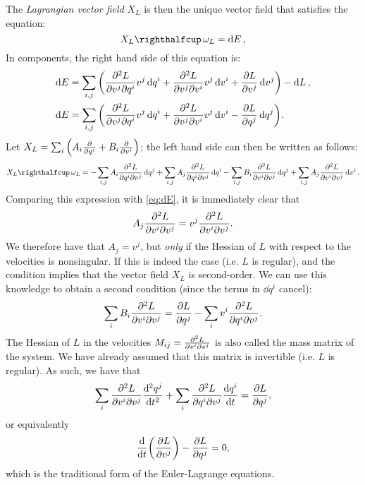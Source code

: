 The \emph{Lagrangian vector field} \(X_L\) is then the unique vector field that satisfies the equation: \cite{Godbillon1969}
\begin{equation}
    \intpr{X_L}{\omega_L} = \dd{E},
    \label{eq:EL_nocomp}
\end{equation}
In components, the right hand side of this equation is:
\begin{equation}
    \begin{split}
        \dd{E} &= \sum_{i, j}\qty(\pdv[2]{L}{v^j}{q^i}v^j\dd{q^i} + \pdv[2]{L}{v^j}{v^i}v^j\dd{v^i} + \pdv{L}{v^j}\dd{v^j}) - \dd{L}, \\
        \dd{E} &= \sum_{i, j}\qty(\pdv[2]{L}{v^j}{q^i}v^j\dd{q^i} + \pdv[2]{L}{v^j}{v^i}v^j\dd{v^i} - \pdv{L}{q^j}\dd{q^j}).
    \end{split}
    \label{eq:dE}
\end{equation}
Let \(X_L = \sum_i \qty( A_i \pdv{}{q^i} + B_i\pdv{}{v^i}) \); the left hand side can then be written as follows:
\begin{equation}
    \intpr{X_L}{\omega_L} =  - \sum_{i,j} A_i \pdv[2]{L}{q^i}{v^j}\dd{q^j} 
                             + \sum_{i,j} A_j \pdv[2]{L}{q^i}{v^j}\dd{q^i} 
                             - \sum_{i, j} B_i \pdv[2]{L}{v^i}{v^j}\dd{q^j}
                             + \sum_{i, j} A_j \pdv[2]{L}{v^i}{v^j}\dd{v^i}.
\end{equation}
Comparing this expression with \cref{eq:dE}, it is immediately clear that
\begin{equation}
     A_j \pdv[2]{L}{v^i}{v^j} = v^j \pdv[2]{L}{v^i}{v^j}.
\end{equation}
We therefore have that \(A_j = v^j\), but \emph{only} if the Hessian of \(L\) with respect to the velocities is nonsingular. If this is indeed the case (i.e. \(L\) is regular), and the condition implies that the vector field \(X_L\) is second-order. We can use this knowledge to obtain a second condition (since the terms in \(\dd{q^i}\) cancel): 
\begin{equation}
     \sum_{i} B_i \pdv[2]{L}{v^i}{v^j} = \pdv{L}{q^j} - \sum_{i} v^i \pdv[2]{L}{q^i}{v^j}.
\end{equation}
The Hessian of \(L\) in the velocities \(M_{ij} = \pdv[2]{L}{v^i}{v^j}\) is also called the mass matrix of the system. We have already assumed that this matrix is invertible (i.e. \(L\) is regular). As such, we have that
\begin{equation}
     \sum_{i}\pdv[2]{L}{v^i}{v^j}\dv[2]{q^j}{t} + \sum_{i} \pdv[2]{L}{q^i}{v^j}\dv{q^i}{t} = \pdv{L}{q^j},
\end{equation}
or equivalently
\begin{equation}
     \dv{}{t}\qty(\pdv{L}{v^j}) - \pdv{L}{q^j} = 0,
\end{equation}
which is the traditional form of the Euler-Lagrange equations.

